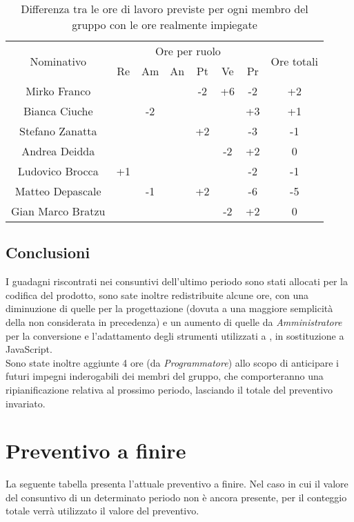 \begin{flushleft}
\begin{table}[H]
\begin{center}
\begin{tabularx}{\textwidth}{|c|cccccc|c|}
				\hline
				\multirow{2}{*}{Nominativo} & \multicolumn{6}{c|}{Ore per ruolo} & \multirow{2}{*}{Ore totali} \\ \cline{2-7}
				& Re & Am & An & Pt & Ve & Pr &      \\ \hline
				\endhead
				Mirko Franco       &   &  &   & -2  & +6 & -2  & +2        \\ \hline
				Bianca Ciuche      &   & -2  &   &   &  & +3  & +1        \\ \hline
				Stefano Zanatta    &   &  &   &	 +2 &  &  -3 & -1        \\ \hline
				Andrea Deidda      &   &  &   &   & -2 & +2  & 0  		\\ \hline
				Ludovico Brocca    &  +1 &  &   &   &  & -2  & -1        \\ \hline
				Matteo Depascale   &   & -1&  & +2&  &	-6 & -5  		\\ \hline
				Gian Marco Bratzu  & &  &   &   & -2 & +2  & 0        \\ \hline
				
			\end{tabularx}
			\caption{Differenza tra le ore di lavoro previste per ogni membro del gruppo con le ore realmente impiegate }
		\end{center}
	\end{table}

	\subsection{Conclusioni}
	I guadagni riscontrati nei consuntivi dell'ultimo periodo sono stati allocati per la codifica del prodotto, sono sate inoltre redistribuite alcune ore, con una diminuzione di quelle per la progettazione (dovuta a una maggiore semplicità della  non considerata in precedenza) e un aumento di quelle da \textit{Amministratore} per la conversione e l'adattamento degli strumenti utilizzati a , in sostituzione a JavaScript.\\
	Sono state inoltre aggiunte 4 ore (da \textit{Programmatore}) allo scopo di anticipare i futuri impegni inderogabili dei membri del gruppo, che comporteranno una ripianificazione relativa al prossimo periodo, lasciando il totale del preventivo invariato.\\
	
\section{Preventivo a finire}
	La seguente tabella presenta l’attuale preventivo a finire. Nel caso in cui il
	valore del consuntivo di un determinato periodo non è ancora presente, per
	il conteggio totale verrà utilizzato il valore del preventivo.
	

\end{flushleft}
